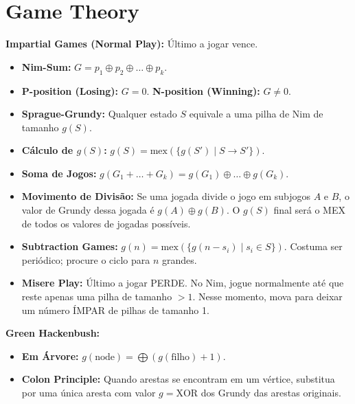 \section{Game Theory}

\textbf{Impartial Games (Normal Play):} Último a jogar vence.
\begin{itemize}[leftmargin=*, nosep]
    \item \textbf{Nim-Sum:} $G = p_1 \oplus p_2 \oplus \dots \oplus p_k$. 
    \item \textbf{P-position (Losing):} $G = 0$. \textbf{N-position (Winning):} $G \neq 0$.
    \item \textbf{Sprague-Grundy:} Qualquer estado $S$ equivale a uma pilha de Nim de tamanho $g(S)$.
    \item \textbf{Cálculo de $g(S)$:} $g(S) = \text{mex}(\{g(S') \mid S \to S'\})$.
    \item \textbf{Soma de Jogos:} $g(G_1 + \dots + G_k) = g(G_1) \oplus \dots \oplus g(G_k)$.
    \item \textbf{Movimento de Divisão:} Se uma jogada divide o jogo em subjogos $A$ e $B$, o valor de Grundy dessa jogada é $g(A) \oplus g(B)$. O $g(S)$ final será o MEX de todos os valores de jogadas possíveis.
    \item \textbf{Subtraction Games:} $g(n) = \text{mex}(\{g(n-s_i) \mid s_i \in S\})$. Costuma ser periódico; procure o ciclo para $n$ grandes.
    \item \textbf{Misere Play:} Último a jogar PERDE. No Nim, jogue normalmente até que reste apenas uma pilha de tamanho $>1$. Nesse momento, mova para deixar um número ÍMPAR de pilhas de tamanho 1.
\end{itemize}

\textbf{Green Hackenbush:} 
\begin{itemize}[leftmargin=*, nosep]
    \item \textbf{Em Árvore:} $g(\text{node}) = \bigoplus (g(\text{filho}) + 1)$.
    \item \textbf{Colon Principle:} Quando arestas se encontram em um vértice, substitua por uma única aresta com valor $g = \text{XOR}$ dos Grundy das arestas originais.
\end{itemize}